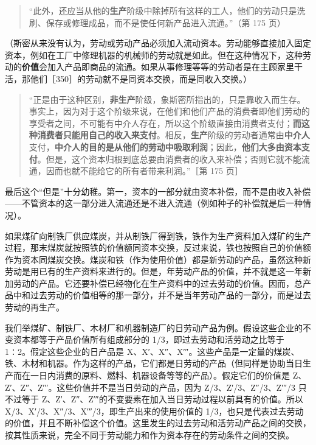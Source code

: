 \begin{quote}“此外，还应当从他的\textbf{生产}阶级中除掉所有这样的工人，他们的劳动只是洗刷、保存或修理成品，而不是使任何新产品进入流通。”（第 175 页）\end{quote}

（斯密从来没有认为，劳动或劳动产品必须加入流动资本。劳动能够直接加入固定资本，例如在工厂中修理机器的机械师的劳动就是如此。但在这种情况下，这种劳动的\textbf{价值}会加入产品即商品的流通。如果从事修理等等的劳动者是在主顾家里干活，那他们［350］的劳动就不是同资本交换，而是同收入交换。）

\begin{quote}“正是由于这种区别，\textbf{非生产}阶级，象斯密所指出的，只是靠收入而生存。事实上，因为对于这个阶级来说，在他们和他们产品的消费者即他们劳动的享受者之间，不可能有中介人存在，所以这个阶级直接由消费者支付；\textbf{而这种消费者只能用自己的收入来支付}。相反，\textbf{生产}阶级的劳动者通常由\textbf{中介人}支付，\textbf{中介人的目的是从他们的劳动中吸取利润}；因此，\textbf{他们大多由资本支付}。但是，这个资本归根到底总要由消费者的收入来补偿；否则它就不能流通，因而也就不能给它的所有者带来利润。”［第 175 页］\end{quote}

最后这个“但是”十分幼稚。第一，资本的一部分就由资本补偿，而不是由收入补偿——不管资本的这一部分进入流通还是不进入流通（例如种子的补偿就是后一种情况）。


如果煤矿向制铁厂供应煤炭，并从制铁厂得到铁，铁作为生产资料加入煤矿的生产过程，那末煤炭就按照铁的价值额同资本交换，反过来说，铁也按照自己的价值额作为资本同煤炭交换。煤炭和铁（作为使用价值）都是新劳动的产品，虽然这种新劳动是用已有的生产资料来进行的。但是，年劳动产品的价值，并不就是这一年新加劳动的产品。它还要补偿已经物化在生产资料中的过去劳动的价值。因而，总产品中和过去劳动的价值相等的那一部分，并不是当年劳动产品的一部分，而是过去劳动的再生产。

我们举煤矿、制铁厂、木材厂和机器制造厂的日劳动产品为例。假设这些企业的不变资本都等于产品价值所有组成部分的 1/3，即过去劳动和活劳动之比等于 1∶2。假定这些企业的日产品是 X、X′、X″、X′″。这些产品是一定量的煤炭、铁、木材和机器。作为这样的产品，它们都是日劳动的产品（但同样是协助当日生产而在一日内消费的原料、燃料、机器设备等等的产品）。假定它们的价值是 Z、Z′、Z″、Z′″。这些价值并不是当日劳动的产品，因为 Z/3、Z′/3、Z″/3、Z′″/3 只不过等于 Z、Z′、Z″、Z′″的不变要素在加入当日劳动过程以前具有的价值。所以 X/3、X′/3、X″/3、X′″/3，即生产出来的使用价值的 1/3，也只是代表过去劳动的价值，并且不断补偿这个价值。\fontbox{~\{}这里发生的过去劳动和活劳动产品之间的交换，按其性质来说，完全不同于劳动能力和作为资本存在的劳动条件之间的交换。\fontbox{\}~}

